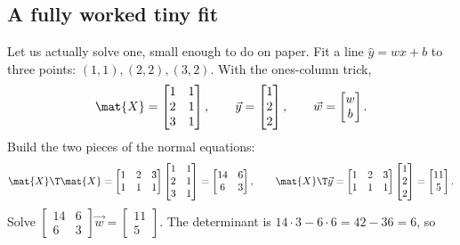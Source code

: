 \subsection{A fully worked tiny fit}

Let us actually solve one, small enough to do on paper. Fit a line $\hat{y}=w x + b$ to
three points: $(1,1),(2,2),(3,2)$. With the ones-column trick,
\[
\mat{X}=\begin{bmatrix} 1 & 1 \\ 2 & 1 \\ 3 & 1 \end{bmatrix},
\qquad
\vec{y}=\begin{bmatrix} 1 \\ 2 \\ 2 \end{bmatrix},
\qquad
\vec{w}=\begin{bmatrix} w \\ b \end{bmatrix}.
\]
Build the two pieces of the normal equations:
\[
\mat{X}\T\mat{X}=\begin{bmatrix} 1&2&3 \\ 1&1&1 \end{bmatrix}
\begin{bmatrix} 1&1 \\ 2&1 \\ 3&1 \end{bmatrix}
=\begin{bmatrix} 14 & 6 \\ 6 & 3 \end{bmatrix},
\qquad
\mat{X}\T\vec{y}=\begin{bmatrix} 1&2&3 \\ 1&1&1 \end{bmatrix}
\begin{bmatrix} 1\\2\\2 \end{bmatrix}
=\begin{bmatrix} 11 \\ 5 \end{bmatrix}.
\]
Solve $\begin{bmatrix} 14&6\\6&3 \end{bmatrix}\vec{w}=\begin{bmatrix}11\\5\end{bmatrix}$.
The determinant is $14\cdot 3 - 6\cdot 6 = 42-36 = 6$, so
